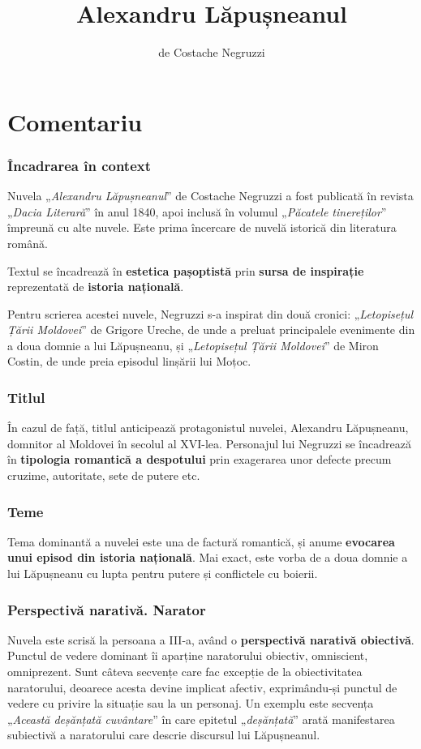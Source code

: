 \documentclass{article}
\title{Alexandru Lăpușneanul}
\author{de Costache Negruzzi}
\date{}
\newcommand{\qu}[1]{„\emph{#1}”}
\begin{document}
\maketitle

\part*{Comentariu}
\section{Încadrarea în context}
Nuvela \qu{Alexandru Lăpușneanul} de Costache Negruzzi a fost publicată în revista \qu{Dacia Literară} în anul 1840, apoi inclusă în volumul \qu{Păcatele tinereților} împreună cu alte nuvele. Este prima încercare de nuvelă istorică din literatura română.

Textul se încadrează în \textbf{estetica pașoptistă} prin \textbf{sursa de inspirație} reprezentată de \textbf{istoria națională}.

Pentru scrierea acestei nuvele, Negruzzi s-a inspirat din două cronici: \qu{Letopisețul Țării Moldovei} de Grigore Ureche, de unde a preluat principalele evenimente din a doua domnie a lui Lăpușneanu, și \qu{Letopisețul Țării Moldovei} de Miron Costin, de unde preia episodul linșării lui Moțoc.
\section{Titlul}
În cazul de față, titlul anticipează protagonistul nuvelei, Alexandru Lăpușneanu, domnitor al Moldovei în secolul al XVI-lea. Personajul lui Negruzzi se încadrează în \textbf{tipologia romantică a despotului} prin exagerarea unor defecte precum cruzime, autoritate, sete de putere etc.
\section{Teme}
Tema dominantă a nuvelei este una de factură romantică, și anume \textbf{evocarea unui episod din istoria națională}. Mai exact, este vorba de a doua domnie a lui Lăpușneanu cu lupta pentru putere și conflictele cu boierii.
\section{Perspectivă narativă. Narator}
Nuvela este scrisă la persoana a III-a, având o \textbf{perspectivă narativă obiectivă}. Punctul de vedere dominant îi aparține naratorului obiectiv, omniscient, omniprezent. Sunt câteva secvențe care fac excepție de la obiectivitatea naratorului, deoarece acesta devine implicat afectiv, exprimându-și punctul de vedere cu privire la situație sau la un personaj. Un exemplu este secvența \qu{Această deșănțată cuvântare} în care epitetul \qu{deșănțată} arată manifestarea subiectivă a naratorului care descrie discursul lui Lăpușneanul.
\end{document}
